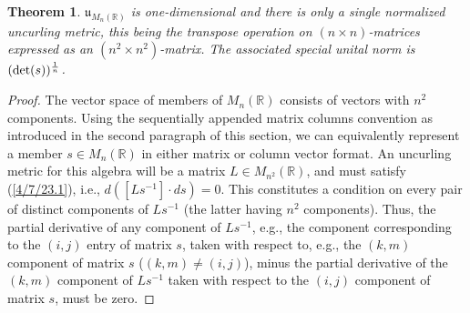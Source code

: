 \documentclass{amsart}
\numberwithin{equation}{section}
\newtheorem{theorem}{Theorem}
\theoremstyle{definition}
\numberwithin{theorem}{section}
\begin{document}
   
 \begin{theorem} \label{4/8/22.1} $\mathfrak{u}_{M_n(\mathbb{R})}$ is one-dimensional and there is only a single normalized uncurling metric, this being the  transpose operation on $(n\times n)$-matrices expressed as an $(n^2\times n^2)$-matrix. The associated special unital norm is $({\rm det}(s))^{\frac{1}{n}}$. \end{theorem}
 \begin{proof} The vector space of members of $ M_n(\mathbb{R})$ consists of  vectors with $n^2$ components.   Using the sequentially appended matrix columns convention as introduced in the second paragraph of this section, we can equivalently represent a member $s\in M_n(\mathbb{R})$ in either matrix or column vector format.   An uncurling metric for this algebra will be a matrix $L\in M_{n^2}(\mathbb{R})$, and must satisfy (\ref{4/7/23.1}), i.e., $d\left([Ls^{-1}]\cdot ds\right)=0$. This constitutes a condition on every pair of distinct components of $Ls^{-1}$ (the latter having $n^2$ components).  Thus,  the partial derivative of any component of $Ls^{-1}$, e.g., the component corresponding to the $(i,j)$ entry of matrix $s$, taken with respect to, e.g., the $(k,m)$ component of matrix $s$ ($(k,m)\ne (i,j)$),  minus  the partial derivative of the $(k,m)$ component of $Ls^{-1}$  taken with respect to the $(i,j)$ component of matrix $s$, must be zero.
 

\end{proof}
\end{document}
